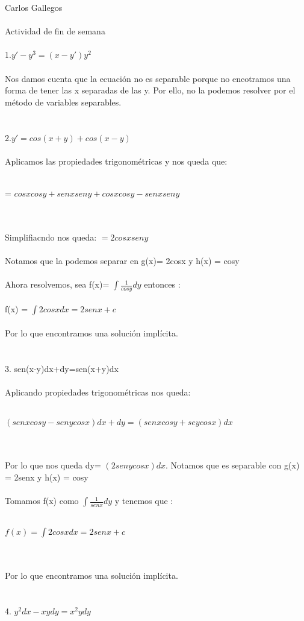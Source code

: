 \documentclass[a4paper,10pt]{article}
\title{}
\author{}
\date{}
\begin{document}
\maketitle
Carlos Gallegos\\\\
Actividad de fin de semana\\\\
1.$y' - y^3 = (x-y')y^2$\\\\
Nos damos cuenta que la ecuación no es separable porque no encotramos una forma de tener las x separadas de las y. Por ello, no la podemos resolver por el método de variables separables.\\\\\\
2.$y'= cos(x+y)+cos(x-y)$\\\\
Aplicamos las propiedades trigonométricas y nos queda que:\\\\
\centerline{= $ cosx cosy + senx seny + cosx cosy - senx seny$}\\\\
Simplifiacndo nos queda: $ = 2cosx seny $\\\\
Notamos que la podemos separar en g(x)= 2cosx y h(x) = cosy\\\\
Ahora resolvemos, sea f(x)= $\int \frac{1}{cosy} dy$ entonces :\\\\
f(x) = $\int 2cosx dx = 2senx + c $\\\\
Por lo que encontramos una solución implícita.\\\\\\
3. sen(x-y)dx+dy=sen(x+y)dx\\\\
Aplicando propiedades trigonométricas nos queda:\\\\
\centerline{$(senx cosy - seny cosx) dx + dy = (senx cosy + sey cosx )dx$ }\\\\
Por lo que nos queda dy= $(2seny cosx) dx$. Notamos que es separable con g(x) = 2senx y h(x) = cosy\\\\
Tomamos f(x) como $\int \frac{1}{senx} dy$ y tenemos que :\\\\
\centerline{$f(x) = \int 2cosx dx = 2senx + c$}\\\\
Por lo que encontramos una solución implícita.\\\\\\
4. $y^2 dx - xy dy = x^2 y dy$\\\\
\end{document}
